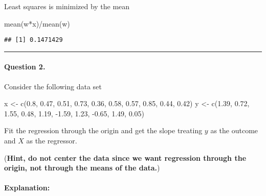 \documentclass[
]{article}
\newenvironment{Shaded}{\begin{snugshade}}{\end{snugshade}}
\newcommand{\FloatTok}[1]{\textcolor[rgb]{0.00,0.00,0.81}{#1}}
\newcommand{\FunctionTok}[1]{\textcolor[rgb]{0.00,0.00,0.00}{#1}}
\newcommand{\NormalTok}[1]{#1}
\newcommand{\OtherTok}[1]{\textcolor[rgb]{0.56,0.35,0.01}{#1}}
\newcommand{\SpecialCharTok}[1]{\textcolor[rgb]{0.00,0.00,0.00}{#1}}
\begin{document}
Least squares is minimized by the mean

\begin{Shaded}
\begin{Highlighting}[]
\FunctionTok{mean}\NormalTok{(w}\SpecialCharTok{*}\NormalTok{x)}\SpecialCharTok{/}\FunctionTok{mean}\NormalTok{(w)}
\end{Highlighting}
\end{Shaded}

\begin{verbatim}
## [1] 0.1471429
\end{verbatim}

\begin{center}\rule{0.5\linewidth}{0.5pt}\end{center}

\hypertarget{question-2.}{%
\paragraph{Question 2.}\label{question-2.}}

Consider the following data set

\begin{Shaded}
\begin{Highlighting}[]
\NormalTok{x }\OtherTok{\textless{}{-}} \FunctionTok{c}\NormalTok{(}\FloatTok{0.8}\NormalTok{, }\FloatTok{0.47}\NormalTok{, }\FloatTok{0.51}\NormalTok{, }\FloatTok{0.73}\NormalTok{, }\FloatTok{0.36}\NormalTok{, }\FloatTok{0.58}\NormalTok{, }\FloatTok{0.57}\NormalTok{, }\FloatTok{0.85}\NormalTok{, }\FloatTok{0.44}\NormalTok{, }\FloatTok{0.42}\NormalTok{)}
\NormalTok{y }\OtherTok{\textless{}{-}} \FunctionTok{c}\NormalTok{(}\FloatTok{1.39}\NormalTok{, }\FloatTok{0.72}\NormalTok{, }\FloatTok{1.55}\NormalTok{, }\FloatTok{0.48}\NormalTok{, }\FloatTok{1.19}\NormalTok{, }\SpecialCharTok{{-}}\FloatTok{1.59}\NormalTok{, }\FloatTok{1.23}\NormalTok{, }\SpecialCharTok{{-}}\FloatTok{0.65}\NormalTok{, }\FloatTok{1.49}\NormalTok{, }\FloatTok{0.05}\NormalTok{)}
\end{Highlighting}
\end{Shaded}

Fit the regression through the origin and get the slope treating \(y\)
as the outcome and \(X\) as the regressor.

(\textbf{Hint, do not center the data since we want regression through
the origin, not through the means of the data.})

\hypertarget{explanation-1}{%
\paragraph{Explanation:}\label{explanation-1}}
\end{document}
